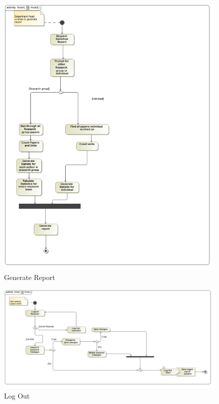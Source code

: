 \documentclass[a4paper,12pt]{article}
\begin{document}
\begin{figure}[H]
    \centering
    \caption{Generate Report}
    \includegraphics[width=1\textwidth]{process-spec/generateReportActivityDiagram.jpg}
\end{figure}

\begin{figure}[H]
    \centering
    \caption{Log Out}
    \includegraphics[width=1\textwidth]{process-spec/logOutActivityDiagraml.jpg}
\end{figure}
\end{document}
